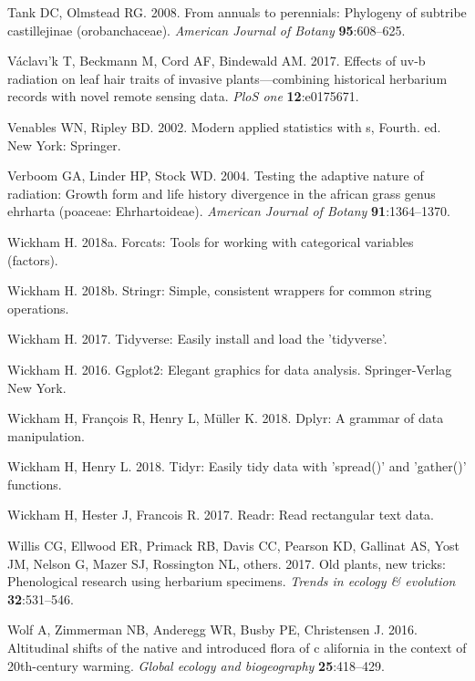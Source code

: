 \documentclass[man,floatsintext]{apa6}
\theoremstyle{definition}
\theoremstyle{definition}
\theoremstyle{definition}
\theoremstyle{remark}
\begin{document}
\leavevmode\hypertarget{ref-tank2008annuals}{}%
Tank DC, Olmstead RG. 2008. From annuals to perennials: Phylogeny of
subtribe castillejinae (orobanchaceae). \emph{American Journal of
Botany} \textbf{95}:608--625.

\leavevmode\hypertarget{ref-vaclavik2017effects}{}%
Václavı'k T, Beckmann M, Cord AF, Bindewald AM. 2017. Effects of uv-b
radiation on leaf hair traits of invasive plants---combining historical
herbarium records with novel remote sensing data. \emph{PloS one}
\textbf{12}:e0175671.

\leavevmode\hypertarget{ref-R-MASS}{}%
Venables WN, Ripley BD. 2002. Modern applied statistics with s, Fourth.
ed. New York: Springer.

\leavevmode\hypertarget{ref-verboom2004testing}{}%
Verboom GA, Linder HP, Stock WD. 2004. Testing the adaptive nature of
radiation: Growth form and life history divergence in the african grass
genus ehrharta (poaceae: Ehrhartoideae). \emph{American Journal of
Botany} \textbf{91}:1364--1370.

\leavevmode\hypertarget{ref-R-forcats}{}%
Wickham H. 2018a. Forcats: Tools for working with categorical variables
(factors).

\leavevmode\hypertarget{ref-R-stringr}{}%
Wickham H. 2018b. Stringr: Simple, consistent wrappers for common string
operations.

\leavevmode\hypertarget{ref-R-tidyverse}{}%
Wickham H. 2017. Tidyverse: Easily install and load the 'tidyverse'.

\leavevmode\hypertarget{ref-R-ggplot2}{}%
Wickham H. 2016. Ggplot2: Elegant graphics for data analysis.
Springer-Verlag New York.

\leavevmode\hypertarget{ref-R-dplyr}{}%
Wickham H, François R, Henry L, Müller K. 2018. Dplyr: A grammar of data
manipulation.

\leavevmode\hypertarget{ref-R-tidyr}{}%
Wickham H, Henry L. 2018. Tidyr: Easily tidy data with 'spread()' and
'gather()' functions.

\leavevmode\hypertarget{ref-R-readr}{}%
Wickham H, Hester J, Francois R. 2017. Readr: Read rectangular text
data.

\leavevmode\hypertarget{ref-willis2017old}{}%
Willis CG, Ellwood ER, Primack RB, Davis CC, Pearson KD, Gallinat AS,
Yost JM, Nelson G, Mazer SJ, Rossington NL, others. 2017. Old plants,
new tricks: Phenological research using herbarium specimens.
\emph{Trends in ecology \& evolution} \textbf{32}:531--546.

\leavevmode\hypertarget{ref-wolf2016altitudinal}{}%
Wolf A, Zimmerman NB, Anderegg WR, Busby PE, Christensen J. 2016.
Altitudinal shifts of the native and introduced flora of c alifornia in
the context of 20th-century warming. \emph{Global ecology and
biogeography} \textbf{25}:418--429.
\end{document}

